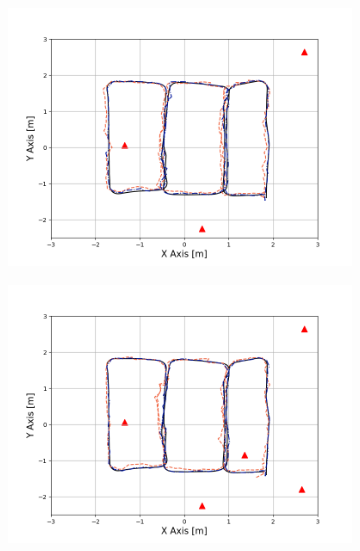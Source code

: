 \documentclass[letterpaper, 10 pt, conference]{ieeeconf}
\begin{document}
\begin{figure}[h]
	\centering
	\begin{subfigure}[b]{0.32\textwidth}
		\includegraphics[width=\textwidth]{image/trajectory_3}
		\caption{}
		\label{fig:anchor_3}
	\end{subfigure}
	\begin{subfigure}[b]{0.32\textwidth}
		\includegraphics[width=\textwidth]{image/trajectory_5}
		\caption{}
		\label{fig:anchor_5}
	\end{subfigure}

\end{figure}
\end{document}
